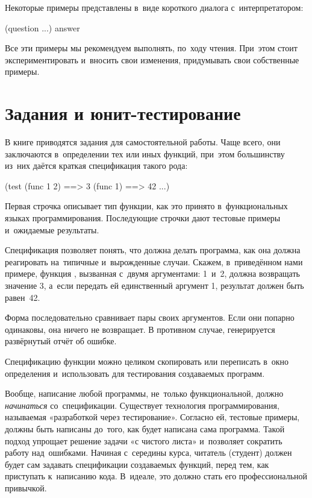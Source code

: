 Некоторые примеры представлены в~виде короткого диалога с~интерпретатором:

\REPL
  {(question ...)}
  {answer}

Все эти примеры мы рекомендуем выполнять, по~ходу чтения. При~этом стоит экспериментировать и~вносить свои изменения, придумывать свои собственные примеры.

\section{Задания и юнит-тестирование}%
В книге приводятся задания для самостоятельной работы. Чаще всего, они заключаются в~определении тех или иных функций, при~этом большинству из~них даётся краткая спецификация такого рода:

\begin{Specification}
(test 
  (func 1 2)  ==> 3
  (func 1)    ==> 42
  ...)
\end{Specification}

\noindent Первая строчка описывает тип функции, как это принято в~функциональных языках программирования. Последующие строчки дают тестовые примеры и~ожидаемые результаты. 

Спецификация позволяет понять, что должна делать программа, как она должна реагировать на~типичные и~вырожденные случаи. Скажем, в~приведённом нами примере, функция , вызванная с~двумя аргументами: 1~и~2, должна возвращать значение 3, а~если передать ей единственный аргумент 1, результат должен быть равен~42.

Форма   последовательно сравнивает пары своих аргументов. Если они попарно одинаковы, она ничего не возвращает. В противном случае, генерируется развёрнутый отчёт об ошибке.

Спецификацию функции можно целиком скопировать или переписать в~окно определения  и~использовать для тестирования создаваемых программ.

Вообще, написание любой программы, не~только функциональной, должно \emph{начинаться} со~спецификации. Существует технология программирования, называемая «разработкой через тестирование». Согласно ей, тестовые примеры, должны быть написаны до~того, как будет написана сама программа. Такой подход упрощает решение задачи «с чистого листа» и~позволяет сократить работу над~ошибками. Начиная с~середины курса, читатель (студент) должен будет сам задавать спецификации создаваемых функций, перед тем, как приступать к~написанию кода. В~идеале, это должно стать его профессиональной привычкой.

